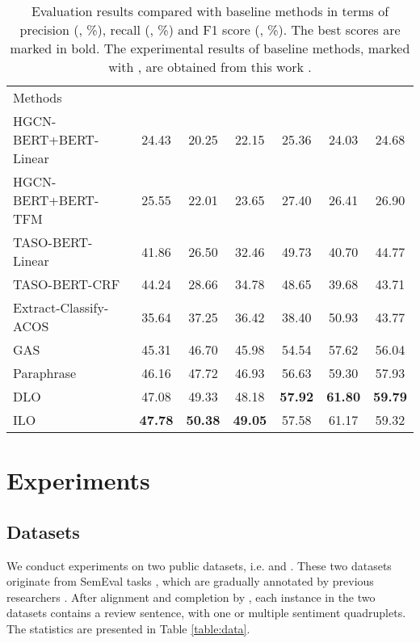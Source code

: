 \documentclass[11pt]{article}
\begin{document}
\begin{table*}[]
\small
    \centering
    \begin{tabular}{l|ccc|ccc}
    \toprule
    \multirow{2}{*}{Methods} & \multicolumn{3}{c|}{} & \multicolumn{3}{c}{} \\
    &  &  &  &  &  &  \\
    \midrule
    HGCN-BERT+BERT-Linear \cite{cai2020aspect} & 24.43 & 20.25 & 22.15 & 25.36 & 24.03 & 24.68 \\
    HGCN-BERT+BERT-TFM \cite{cai2020aspect} & 25.55 & 22.01 & 23.65 & 27.40 & 26.41 & 26.90 \\
    TASO-BERT-Linear \cite{wan2020target} & 41.86 & 26.50 & 32.46 & 49.73 & 40.70 & 44.77 \\
    TASO-BERT-CRF \cite{wan2020target} & 44.24 & 28.66 & 34.78 & 48.65 & 39.68 & 43.71 \\
    Extract-Classify-ACOS \cite{cai2021aspect} & 35.64 & 37.25 & 36.42 & 38.40 & 50.93 & 43.77 \\
    GAS \cite{zhang-etal-2021-towards-generative} & 45.31 & 46.70 & 45.98 & 54.54 & 57.62 & 56.04 \\
    Paraphrase \cite{zhang-etal-2021-aspect-sentiment} & 46.16 & 47.72 & 46.93 & 56.63 & 59.30 & 57.93 \\
    \midrule
DLO & 47.08 & 49.33 & 48.18 & \textbf{57.92} & \textbf{61.80} & \textbf{59.79} \\
    ILO & \textbf{47.78} & \textbf{50.38} & \textbf{49.05} & 57.58 & 61.17 & 59.32 \\
\bottomrule
    \end{tabular}
    \caption{Evaluation results compared with baseline methods in terms of precision (, \%), recall (, \%) and F1 score (, \%). The best scores are marked in bold. The experimental results of baseline methods, marked with , are obtained from this work \cite{zhang-etal-2021-aspect-sentiment}.}
    \label{table:results}
\end{table*}

\section{Experiments}

\subsection{Datasets}
We conduct experiments on two public datasets, i.e.  and  \cite{zhang-etal-2021-aspect-sentiment}. These two datasets originate from SemEval tasks \cite{pontiki2015semeval,pontiki2016semeval}, which are gradually annotated by previous researchers \cite{peng2020knowing,wan2020target}. After alignment and completion by \citet{zhang-etal-2021-aspect-sentiment}, each instance in the two datasets contains a review sentence, with one or multiple sentiment quadruplets. The statistics are presented in Table \ref{table:data}.
\end{document}
